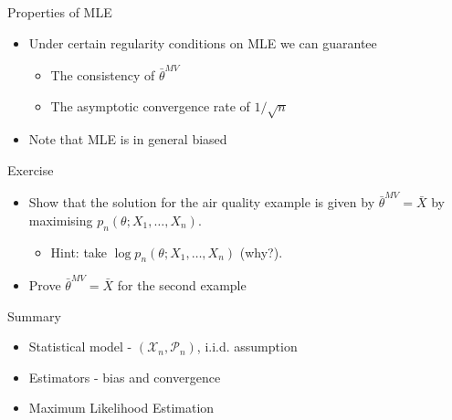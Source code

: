 \documentclass{beamer}
\begin{document}
\begin{frame}{Properties of MLE}  
\begin{itemize} 
 \item Under certain regularity conditions on MLE we can guarantee
 \begin{itemize} 
 \item The consistency of $\bar{\theta}^{MV}$ 
 \item The asymptotic convergence rate of $1/\sqrt{n}$ 
 \end{itemize}
 \item Note that MLE is in general biased 
\end{itemize}
\end{frame}

\begin{frame}{Exercise}  
\begin{itemize} 
 \item Show that the solution for the air quality example is given by $\bar{\theta}^{MV} = \bar{X}$ by maximising $p_n(\theta; X_1, \ldots, X_n)$. 
 \begin{itemize}
 \item Hint: take $\log p_n(\theta; X_1, \ldots, X_n)$ (why?). 
 \end{itemize}
 \item Prove $\bar{\theta}^{MV} = \bar{X}$ for the second example 
\end{itemize}
\end{frame}


\begin{frame}{Summary}  
\begin{itemize} 
 \item Statistical model - $(\mathcal{X}_n, \mathcal{P}_n)$, i.i.d. assumption 
 \item Estimators - bias and convergence 
 \item Maximum Likelihood Estimation 
\end{itemize} 
\end{frame}
\end{document}
